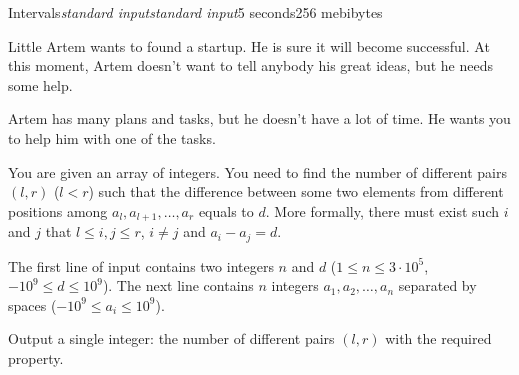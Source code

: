 \begin{problem}{Intervals}{\textsl{standard input}}{\textsl{standard input}}{5 seconds}{256 mebibytes}{}

Little Artem wants to found a startup. He is sure it will become successful. At this moment, Artem doesn't want to tell anybody his great ideas, but he needs some help.

Artem has many plans and tasks, but he doesn't have a lot of time. He wants you to help him with one of the tasks.

You are given an array of integers. You need to find the number of different pairs $(l, r)$ ($l < r$) such that the difference between some two elements from different positions among $a_l, a_{l+1}, \ldots, a_r$ equals to $d$. More formally, there must exist such $i$ and $j$ that $l \le i, j \le r$, $i \neq j$ and $a_i - a_j = d$.

\InputFile
The first line of input contains two integers $n$ and $d$ ($1 \le n \le 3 \cdot 10^5$, $-10^9 \le d \le 10^9$). The next line contains $n$ integers $a_1, a_2, \ldots, a_n$ separated by spaces ($-10^9 \le a_i \le 10^9$).

\OutputFile
Output a single integer: the number of different pairs $(l, r)$ with the required property. 

\Examples

\begin{example}
\end{example}

\end{problem}
